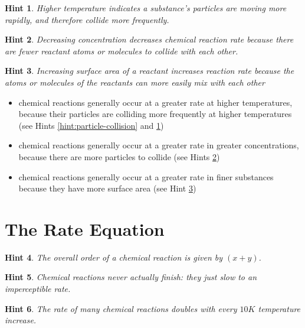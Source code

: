 \documentclass[11pt, oneside]{article}   	%
\newtheorem{hint}{Hint}
\begin{document}
\begin{hint}\label{hint:particle-collision-rate}
Higher temperature indicates a substance's particles are moving more rapidly, and therefore collide more frequently.
\end{hint}

\begin{hint}\label{hint:reaction-concentration}
Decreasing concentration decreases chemical reaction rate because there are fewer reactant atoms or molecules to collide with each other.
\end{hint}

\begin{hint}\label{hint:reaction-surface-area}
Increasing surface area of a reactant increases reaction rate because the atoms or molecules of the reactants can more easily mix with each other
\end{hint}

\begin{itemize}
\item chemical reactions generally occur at a greater rate at higher temperatures, because their particles are colliding more frequently at higher temperatures (see Hints \ref{hint:particle-collision} and \ref{hint:particle-collision-rate})
\item chemical reactions generally occur at a greater rate in greater concentrations, because there are more particles to collide (see Hints \ref{hint:reaction-concentration})
\item chemical reactions generally occur at a greater rate in finer substances because they have more surface area (see Hint \ref{hint:reaction-surface-area})
\end{itemize}


\section{The Rate Equation}

\begin{hint}\label{hint:reaction-rate-order}
The \emph{overall order of a chemical reaction} is given by $(x + y)$.
\end{hint}

\begin{hint}\label{hint:reactions-never-finish}
Chemical reactions never actually finish: they just slow to an imperceptible rate.
\end{hint}

\begin{hint}\label{hint:reactions-constant-and-temperature}
The rate of many chemical reactions doubles with every $10 K$ temperature increase.
\end{hint}
\end{document}
